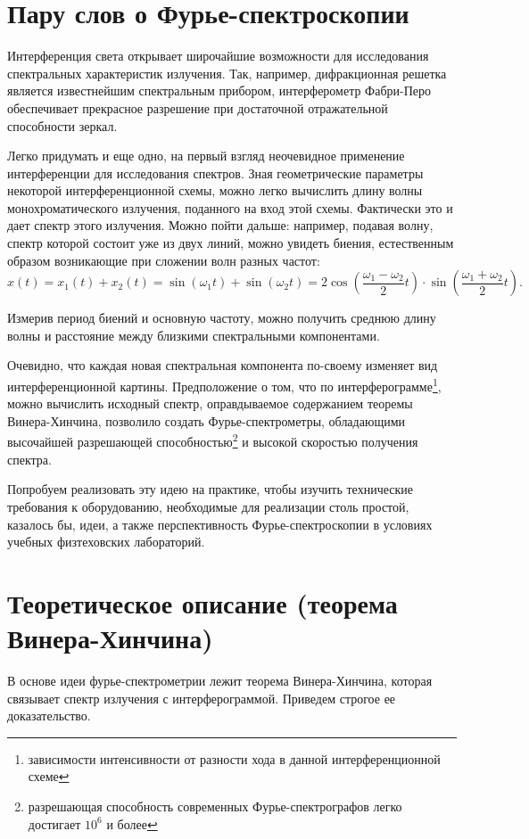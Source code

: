 \documentclass{urticle}
\begin{document}



\section*{Пару слов о Фурье-спектроскопии}
Интерференция света открывает широчайшие возможности для исследования спектральных характеристик излучения. Так, например, дифракционная решетка является известнейшим спектральным прибором, интерферометр Фабри-Перо обеспечивает прекрасное разрешение при достаточной отражательной способности зеркал.

Легко придумать и еще одно, на первый взгляд неочевидное применение интерференции для исследования спектров. Зная геометрические параметры некоторой интерференционной схемы, можно легко вычислить длину волны монохроматического излучения, поданного на вход этой схемы. Фактически это и дает спектр этого излучения. Можно пойти дальше: например, подавая волну, спектр которой состоит уже из двух линий, можно увидеть биения, естественным образом возникающие при сложении волн разных частот:
$$x(t) = x_1(t) + x_2(t) = \sin(\omega_1 t) + \sin(\omega_2 t) =
2\cos\left(\frac{\omega_1-\omega_2}{2}t\right)\cdot\sin\left(\frac{\omega_1+\omega_2}{2}t\right).$$

Измерив период биений и основную частоту, можно получить среднюю длину волны и расстояние между близкими спектральными компонентами.

Очевидно, что каждая новая спектральная компонента по-своему изменяет вид интерференционной картины. Предположение о том, что по интерферограмме\footnote{зависимости интенсивности от разности хода в данной интерференционной схеме}, можно вычислить исходный спектр, оправдываемое содержанием теоремы Винера-Хинчина, позволило создать Фурье-спектрометры, обладающими высочайшей разрешающей способностью\footnote{разрешающая способность современных Фурье-спектрографов легко достигает $10^6$ и более} и высокой скоростью получения спектра.

Попробуем реализовать эту идею на практике, чтобы изучить технические требования к оборудованию, необходимые для реализации столь простой, казалось бы, идеи, а также перспективность Фурье-спектроскопии в условиях учебных физтеховских лабораторий.

\newpage
\section*{Теоретическое описание (теорема Винера-Хинчина)}
В основе идеи фурье-спектрометрии лежит теорема Винера-Хинчина, которая связывает спектр излучения с интерферограммой. Приведем строгое ее доказательство.
\end{document}
